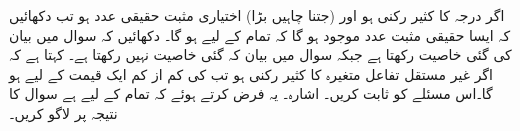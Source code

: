 \quad
اگر  درجہ  کا کثیر رکنی ہو اور  (جتنا چاہیں بڑا) اختیاری مثبت حقیقی عدد ہو تب دکھائیں کہ ایسا حقیقی مثبت عدد  موجود ہو گا کہ تمام  کے لیے  ہو گا۔
\quad
دکھائیں کہ  سوال  میں بیان کی گئی خاصیت رکھتا ہے جبکہ سوال  میں بیان کہ گئی خاصیت نہیں رکھتا ہے۔
\quad
{} کہتا ہے کہ  اگر غیر مستقل تفاعل  متغیرہ  کا کثیر رکنی ہو تب  کی  کم از کم ایک قیمت کے لیے  ہو گا۔اس مسئلے کو ثابت کریں۔ اشارہ۔ یہ فرض کرتے ہوئے  کہ تمام  کے لیے   ہے سوال   کا نتیجہ  پر لاگو کریں۔
